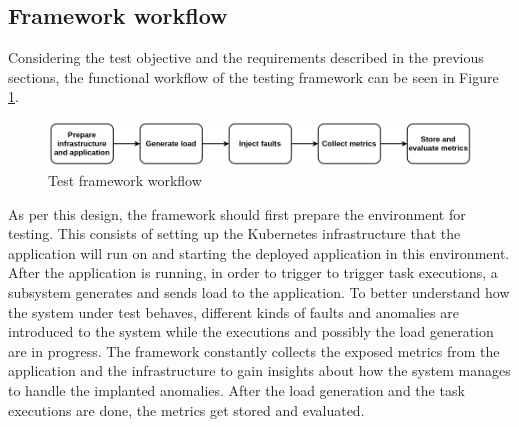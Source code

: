 
\subsection{Framework workflow} \label{test-design-workflow}



Considering the test objective and the requirements described in the previous sections, the functional workflow of the testing framework can be seen in Figure \ref{fig:test_framework_workflow}.

\begin{figure}[h]
	\centering
	\includegraphics[width=140mm, keepaspectratio]{figures/test_framework_workflow.png}
	\caption{Test framework workflow}
	\label{fig:test_framework_workflow}
\end{figure}

As per this design, the framework should first prepare the environment for testing. This consists of setting up the Kubernetes infrastructure that the application will run on and starting the deployed application in this environment. After the application is running, in order to trigger to trigger task executions, a subsystem generates and sends load to the application. To better understand how the system under test behaves, different kinds of faults and anomalies are introduced to the system while the executions and possibly the load generation are in progress. The framework constantly collects the exposed metrics from the application and the infrastructure to gain insights about how the system manages to handle the implanted anomalies. After the load generation and the task executions are done, the metrics get stored and evaluated.

